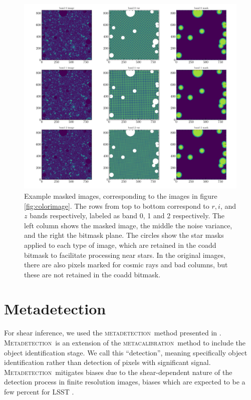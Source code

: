 \documentclass[twocolumn,twocolappendix,astrosym]{openjournal}
\newcommand{\mcal}{\textsc{metacalibration}}
\newcommand{\mdet}{\textsc{metadetection}}
\newcommand{\Mdet}{\textsc{Metadetection}}
\begin{document}
\begin{figure}
    \includegraphics[width=\columnwidth]{example-masked-image.pdf}
    \caption{
        Example masked images, corresponding to the images in figure
        \ref{fig:colorimage}.  The rows from top to bottom correspond to $r,
        i$, and $z$ bands respectively, labeled as band 0, 1 and 2
        respectively.  The left column shows the masked image, the middle the
        noise variance, and the right the bitmask plane.  The circles show the
        star masks applied to each type of image, which are retained in the
        coadd bitmask to facilitate processing near stars.  In the original
        images, there are also pixels marked for cosmic rays and bad columns,
        but these are not retained in the coadd bitmask.
    } \label{fig:maskimage}
\end{figure}

\section{Metadetection} \label{sec:mdet}

For shear inference, we used the \mdet\ method presented in \cite{mdet20}.
\Mdet\ is an extension of the \mcal\ method
\citep{HuffMcal2017,SheldonMcal2017} to include the object identification
stage. We call this ``detection'', meaning specifically object identification
rather than detection of pixels with significant signal. \Mdet\ mitigates
biases due to the shear-dependent nature of the detection process in finite
resolution images, biases which are expected to be a few percent for LSST
\citep{mdet20}.
\end{document}
